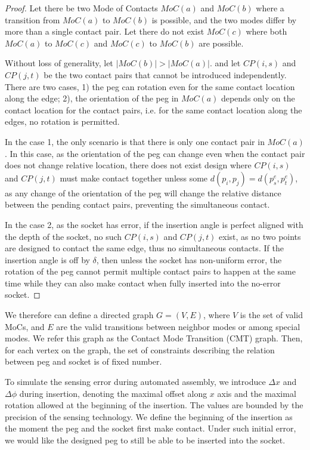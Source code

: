 \documentclass[letterpaper, 10 pt, conference]{ieeeconf}
\begin{document}
\begin{proof}
Let there be two Mode of Contacts $MoC(a)$ and $MoC(b)$ where a transition from $MoC(a)$ to $MoC(b)$ is possible, and the two modes differ by more than a single contact pair. Let there do not exist $MoC(c)$ where both $MoC(a)$ to $MoC(c)$ and $MoC(c)$ to $MoC(b)$ are possible. 

Without loss of generality, let $|MoC(b)| > |MoC(a)|$. and let $CP(i, s)$ and $CP(j, t)$ be the two contact pairs that cannot be introduced independently. There are two cases, 1) the peg can rotation even for the same contact location along the edge; 2), the orientation of the peg in $MoC(a)$ depends only on the contact location for the contact pairs, i.e. for the same contact location along the edges, no rotation is permitted. 

In the case 1, the only scenario is that there is only one contact pair in $MoC(a)$. In this case, as the orientation of the peg can change even when the contact pair does not change relative location, there does not exist design where $CP(i, s)$ and $CP(j, t)$ must make contact together unless some $d(p_i, p_j) = d(p^e_s, p^e_t)$, as any change of the orientation of the peg will change the relative distance between the pending contact pairs, preventing the simultaneous contact. 

In the case 2, as the socket has error, if the insertion angle is perfect aligned with the depth of the socket, no such $CP(i, s)$ and $CP(j, t)$ exist, as no two points are designed to contact the same edge, thus no simultaneous contacts. If the insertion angle is off by $\delta$, then unless the socket has non-uniform error, the rotation of the peg cannot permit multiple contact pairs to happen at the same time while they can also make contact when fully inserted into the no-error socket. 
\end{proof}

We therefore can define a directed graph $G = (V, E)$, where $V$ is the set of valid MoCs, and $E$ are the valid transitions between neighbor modes or among special modes. We refer this graph as the Contact Mode Transition (CMT) graph. Then, for each vertex on the graph, the set of constraints describing the relation between peg and socket is of fixed number. 

To simulate the sensing error during automated assembly, we introduce $\Delta x$ and $\Delta\phi$ during insertion, denoting the maximal offset along $x$ axis and the maximal rotation allowed at the beginning of the insertion. The values are bounded by the precision of the sensing technology. We define the beginning of the insertion as the moment the peg and the socket first make contact. Under such initial error, we would like the designed peg to still be able to be inserted into the socket. 
\end{document}
